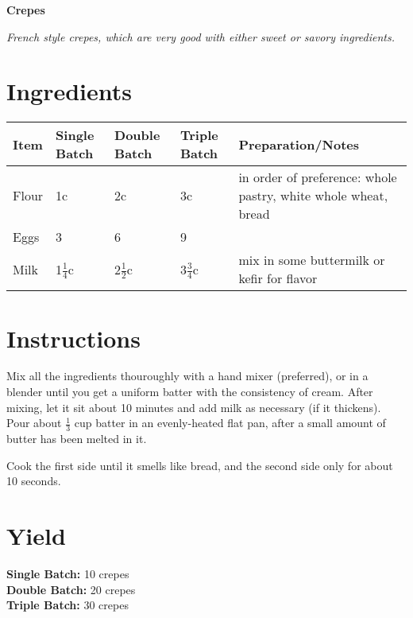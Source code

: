 \documentclass{/home/luke/Reference/Code/Source/latex-python/usr/local/lib/latex_python/recipes/examples/crepes}
\begin{document}
    \begin{center}
        {\Large \textbf{Crepes}}
        
        \small\textit{French style crepes, which are very good with either sweet or savory ingredients.}
    \end{center}
    
    \section*{Ingredients}
    \begin{center}
        
            \begin{tabular}{l l l l l}
                \textbf{Item} & \textbf{Single Batch} & \textbf{Double Batch} & \textbf{Triple Batch} & \textbf{Preparation/Notes} \\
                \hline
                Flour & 1c & 2c & 3c & in order of preference: whole pastry, white whole wheat, bread \\
Eggs & 3 & 6 & 9 &  \\
Milk & 1$\frac{1}{4}$c & 2$\frac{1}{2}$c & 3$\frac{3}{4}$c & mix in some buttermilk or kefir for flavor
            \end{tabular}
        
    \end{center}
    
    \section*{Instructions}
    Mix all the ingredients thouroughly with a hand mixer (preferred), or in a blender
until you get a uniform batter with the consistency of cream. After mixing, 
let it sit about 10 minutes and add milk as necessary (if it thickens). 
Pour about $\frac{1}{3}$ cup batter in an evenly-heated flat pan, after a small amount of 
butter has been melted in it.

Cook the first side until it smells like bread,
and the second side only for about 10 seconds.
    
    \section*{Yield}
    \textbf{Single Batch:} 10 crepes \\
\textbf{Double Batch:} 20 crepes \\
\textbf{Triple Batch:} 30 crepes
\end{document}
